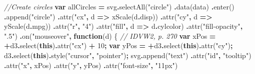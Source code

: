 \documentclass[
  openany]{book}
\newenvironment{Shaded}{\begin{snugshade}}{\end{snugshade}}
\newcommand{\AttributeTok}[1]{\textcolor[rgb]{0.77,0.63,0.00}{#1}}
\newcommand{\CommentTok}[1]{\textcolor[rgb]{0.56,0.35,0.01}{\textit{#1}}}
\newcommand{\DecValTok}[1]{\textcolor[rgb]{0.00,0.00,0.81}{#1}}
\newcommand{\FunctionTok}[1]{\textcolor[rgb]{0.00,0.00,0.00}{#1}}
\newcommand{\KeywordTok}[1]{\textcolor[rgb]{0.13,0.29,0.53}{\textbf{#1}}}
\newcommand{\NormalTok}[1]{#1}
\newcommand{\OperatorTok}[1]{\textcolor[rgb]{0.81,0.36,0.00}{\textbf{#1}}}
\newcommand{\StringTok}[1]{\textcolor[rgb]{0.31,0.60,0.02}{#1}}
\begin{document}
\begin{Shaded}
\begin{Highlighting}[]
    \CommentTok{//Create circles}
    \KeywordTok{var}\NormalTok{ allCircles }\OperatorTok{=}\NormalTok{ svg}\OperatorTok{.}\FunctionTok{selectAll}\NormalTok{(}\StringTok{"circle"}\NormalTok{)}
      \OperatorTok{.}\FunctionTok{data}\NormalTok{(data)}
      \OperatorTok{.}\FunctionTok{enter}\NormalTok{()}
      \OperatorTok{.}\FunctionTok{append}\NormalTok{(}\StringTok{"circle"}\NormalTok{)}
      \OperatorTok{.}\FunctionTok{attr}\NormalTok{(}\StringTok{"cx"}\OperatorTok{,}\NormalTok{ d }\KeywordTok{=\textgreater{}}\NormalTok{ xScale(d}\OperatorTok{.}\AttributeTok{disp}\NormalTok{))}
      \OperatorTok{.}\FunctionTok{attr}\NormalTok{(}\StringTok{"cy"}\OperatorTok{,}\NormalTok{ d }\KeywordTok{=\textgreater{}}\NormalTok{ yScale(d}\OperatorTok{.}\AttributeTok{mpg}\NormalTok{))}
      \OperatorTok{.}\FunctionTok{attr}\NormalTok{(}\StringTok{"r"}\OperatorTok{,} \StringTok{"4"}\NormalTok{)}
      \OperatorTok{.}\FunctionTok{attr}\NormalTok{(}\StringTok{"fill"}\OperatorTok{,}\NormalTok{ d }\KeywordTok{=\textgreater{}}\NormalTok{ d}\OperatorTok{.}\AttributeTok{cylcolor}\NormalTok{)}
      \OperatorTok{.}\FunctionTok{attr}\NormalTok{(}\StringTok{"fill{-}opacity"}\OperatorTok{,} \StringTok{".5"}\NormalTok{)}
      \OperatorTok{.}\FunctionTok{on}\NormalTok{(}\StringTok{"mouseover"}\OperatorTok{,} \KeywordTok{function}\NormalTok{(d) \{ }\CommentTok{// IDVW2, p. 270}
        \KeywordTok{var}\NormalTok{ xPos }\OperatorTok{=} \OperatorTok{+}\NormalTok{d3}\OperatorTok{.}\FunctionTok{select}\NormalTok{(}\KeywordTok{this}\NormalTok{)}\OperatorTok{.}\FunctionTok{attr}\NormalTok{(}\StringTok{"cx"}\NormalTok{) }\OperatorTok{+} \DecValTok{10}\OperatorTok{;}
        \KeywordTok{var}\NormalTok{ yPos }\OperatorTok{=} \OperatorTok{+}\NormalTok{d3}\OperatorTok{.}\FunctionTok{select}\NormalTok{(}\KeywordTok{this}\NormalTok{)}\OperatorTok{.}\FunctionTok{attr}\NormalTok{(}\StringTok{"cy"}\NormalTok{)}\OperatorTok{;}
\NormalTok{        d3}\OperatorTok{.}\FunctionTok{select}\NormalTok{(}\KeywordTok{this}\NormalTok{)}\OperatorTok{.}\FunctionTok{style}\NormalTok{(}\StringTok{"cursor"}\OperatorTok{,} \StringTok{"pointer"}\NormalTok{)}\OperatorTok{;}
\NormalTok{        svg}\OperatorTok{.}\FunctionTok{append}\NormalTok{(}\StringTok{"text"}\NormalTok{)}
          \OperatorTok{.}\FunctionTok{attr}\NormalTok{(}\StringTok{"id"}\OperatorTok{,} \StringTok{"tooltip"}\NormalTok{)}
          \OperatorTok{.}\FunctionTok{attr}\NormalTok{(}\StringTok{"x"}\OperatorTok{,}\NormalTok{ xPos)}
          \OperatorTok{.}\FunctionTok{attr}\NormalTok{(}\StringTok{"y"}\OperatorTok{,}\NormalTok{ yPos)}
          \OperatorTok{.}\FunctionTok{attr}\NormalTok{(}\StringTok{"font{-}size"}\OperatorTok{,} \StringTok{"11px"}\NormalTok{)}

\end{Highlighting}
\end{Shaded}
\end{document}
